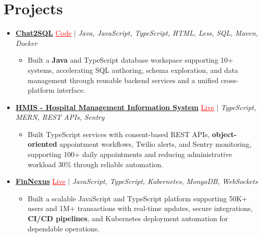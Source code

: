 \documentclass[letterpaper,10pt]{article}
\newcommand{\itemTail}{\vspace{-6pt}}
\newcommand{\projGap}{\vspace{3pt}}
\newcommand{\resumeItem}[1]{\item\small{{#1 \itemTail}}}
\newcommand{\resumeProjectHeading}[1]{\item \small #1 \vspace{-2pt}}
\newcommand{\resumeProjectLink}[2]{\href{#1}{\textcolor{red}{\underline{#2}}}}
\newcommand{\resumeSubHeadingListStart}{\begin{itemize}[leftmargin=0.0in, label={}]}
\newcommand{\resumeSubHeadingListEnd}{\end{itemize}}
\newcommand{\resumeProjItemListStart}{\begin{itemize}[leftmargin=0.15in,label=\textbullet,itemsep=3pt,topsep=0pt,parsep=0pt,partopsep=0pt]}
\newcommand{\resumeProjItemListEnd}{\end{itemize}\vspace{-4pt}}
\begin{document}
\section{Projects}
\resumeSubHeadingListStart
\vspace{-2pt}
\resumeProjectHeading{\href{https://github.com/SAHAJ-BHADJA/Chat2SQL}{\textbf{Chat2SQL}} \resumeProjectLink{https://github.com/SAHAJ-BHADJA/Chat2SQL}{Code} $|$ \emph{Java, JavaScript, TypeScript, HTML, Less, SQL, Maven, Docker}}
\resumeProjItemListStart
\resumeItem{Built a \textbf{Java} and TypeScript database workspace supporting 10+ systems, accelerating SQL authoring, schema exploration, and data management through reusable backend services and a unified cross-platform interface.}
\resumeProjItemListEnd
\projGap
\resumeProjectHeading{\href{https://hims-rouge.vercel.app/}{\textbf{HMIS - Hospital Management Information System}} \resumeProjectLink{https://hims-rouge.vercel.app/}{Live} $|$ \emph{TypeScript, MERN, REST APIs, Sentry}}
\resumeProjItemListStart
\resumeItem{Built TypeScript services with consent-based REST APIs, \textbf{object-oriented} appointment workflows, Twilio alerts, and Sentry monitoring, supporting 100+ daily appointments and reducing administrative workload 30\% through reliable automation.}
\resumeProjItemListEnd
\projGap
\resumeProjectHeading{\href{https://fin-nexus.vercel.app/}{\textbf{FinNexus}} \resumeProjectLink{https://fin-nexus.vercel.app/}{Live} $|$ \emph{JavaScript, TypeScript, Kubernetes, MongoDB, WebSockets}}
\resumeProjItemListStart
\resumeItem{Built a scalable JavaScript and TypeScript platform supporting 50K+ users and 1M+ transactions with real-time updates, secure integrations, \textbf{CI/CD pipelines}, and Kubernetes deployment automation for dependable operations.}
\resumeProjItemListEnd
\resumeSubHeadingListEnd
\end{document}
